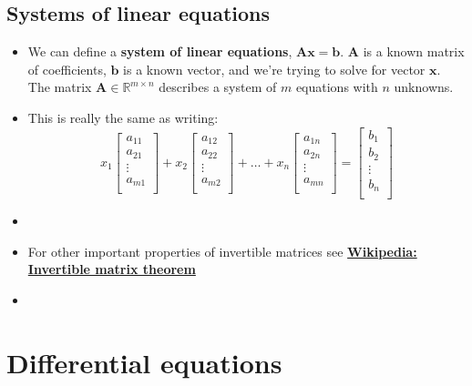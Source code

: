 \documentclass{article}
\begin{document}
\begin{multicols*}{2}
\subsection{Systems of linear equations}
\begin{itemize}
    \item We can define a \textbf{system of linear equations}, $\bm{Ax}=\bm{b}$. $\bm{A}$ is a known matrix of coefficients, $\bm{b}$ is a known vector, and we're trying to solve for vector $\bm{x}$. The matrix $\bm{A} \in \mathbb{R}^{m \times n}$ describes a system of $m$ equations with $n$ unknowns.
    \item This is really the same as writing:
    $$ x_1 \begin{bmatrix}
     a_{11}\\
     a_{21}\\
     \vdots \\
     a_{m1}\\ \end{bmatrix} +
     x_2 \begin{bmatrix}
     a_{12}\\
     a_{22}\\
     \vdots \\
     a_{m2}\\ \end{bmatrix} +
     \hdots +
     x_n \begin{bmatrix}
     a_{1n}\\
     a_{2n}\\
     \vdots \\
     a_{mn}\\ \end{bmatrix} =
     \begin{bmatrix}
     b_{1}\\
     b_{2}\\
     \vdots \\
     b_{n}\\ \end{bmatrix}
     $$


    \item
    \item For other important properties of invertible matrices see \href{https://en.wikipedia.org/wiki/Invertible_matrix#The_invertible_matrix_theorem}
    {\textbf{Wikipedia: Invertible matrix theorem}}
    \item
    \end{itemize}


\section{Differential equations}


\end{multicols*}
\end{document}
